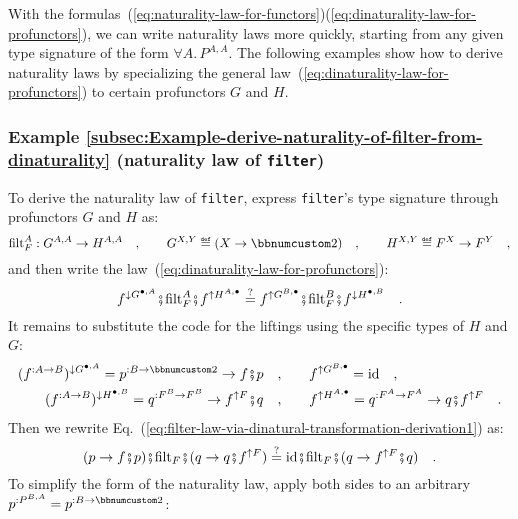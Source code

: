 With the formulas~(\ref{eq:naturality-law-for-functors})\textendash (\ref{eq:dinaturality-law-for-profunctors}),
we can write naturality laws more quickly, starting from any given
type signature of the form $\forall A.\,P^{A,A}$. The following examples
show how to derive naturality laws by specializing the general law~(\ref{eq:dinaturality-law-for-profunctors})
to certain profunctors $G$ and $H$.

\subsubsection{Example \label{subsec:Example-derive-naturality-of-filter-from-dinaturality}\ref{subsec:Example-derive-naturality-of-filter-from-dinaturality}
(naturality law of \lstinline!filter!)}

To derive the naturality law of \lstinline!filter!, express \lstinline!filter!\textsf{'}s
type signature through profunctors $G$ and $H$ as:
\[
\text{filt}_{F}^{A}:G^{A,A}\rightarrow H^{A,A}\quad,\quad\quad G^{X,Y}\triangleq(X\rightarrow\bbnum 2)\quad,\quad\quad H^{X,Y}\triangleq F^{X}\rightarrow F^{Y}\quad,
\]
and then write the law~(\ref{eq:dinaturality-law-for-profunctors}):
\begin{equation}
f^{\downarrow G^{\bullet,A}}\bef\text{filt}_{F}^{A}\bef f^{\uparrow H^{A,\bullet}}\overset{?}{=}f^{\uparrow G^{B,\bullet}}\bef\text{filt}_{F}^{B}\bef f^{\downarrow H^{\bullet,B}}\quad.\label{eq:filter-law-via-dinatural-transformation-derivation1}
\end{equation}
It remains to substitute the code for the liftings using the specific
types of $H$ and $G$:
\begin{align*}
(f^{:A\rightarrow B})^{\downarrow G^{\bullet,A}}=p^{:B\rightarrow\bbnum 2}\rightarrow f\bef p\quad, & \quad\quad f^{\uparrow G^{B,\bullet}}=\text{id}\quad,\\
(f^{:A\rightarrow B})^{\downarrow H^{\bullet,B}}=q^{:F^{B}\rightarrow F^{B}}\rightarrow f^{\uparrow F}\bef q\quad, & \quad\quad f^{\uparrow H^{A,\bullet}}=q^{:F^{A}\rightarrow F^{A}}\rightarrow q\bef f^{\uparrow F}\quad.
\end{align*}
Then we rewrite Eq.~(\ref{eq:filter-law-via-dinatural-transformation-derivation1})
as:
\[
(p\rightarrow f\bef p)\bef\text{filt}_{F}\bef(q\rightarrow q\bef f^{\uparrow F})\overset{?}{=}\text{id}\bef\text{filt}_{F}\bef(q\rightarrow f^{\uparrow F}\bef q)\quad.
\]
To simplify the form of the naturality law, apply both sides to an
arbitrary $p^{:P^{B,A}}=p^{:B\rightarrow\bbnum 2}$:
